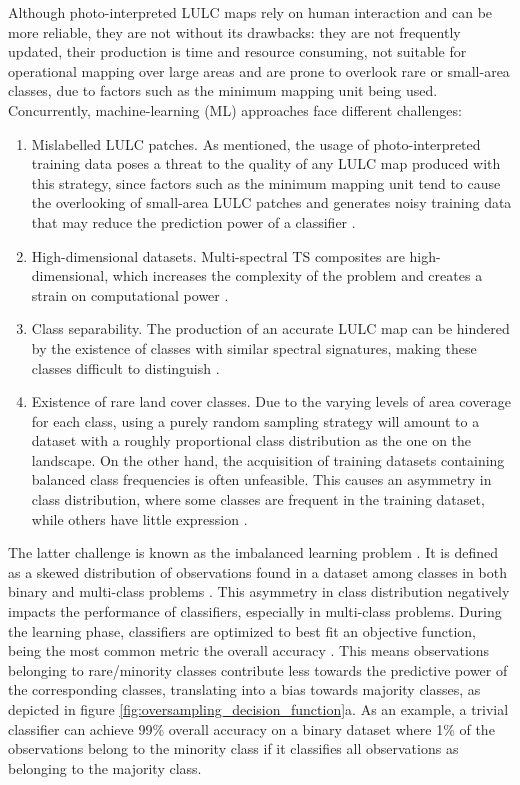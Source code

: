 \documentclass[parskip=full]{scrartcl}
\begin{document}
Although photo-interpreted LULC maps rely on human interaction and can be more
reliable, they are not without its drawbacks: they are not frequently updated,
their production is time and resource consuming, not suitable for operational
mapping over large areas and are prone to overlook rare or small-area classes,
due to factors such as the minimum mapping unit being used. Concurrently,
machine-learning (ML) approaches face different challenges:
\begin{enumerate}
	\item Mislabelled LULC patches. As mentioned, the usage of photo-interpreted training
	      data poses a threat to the quality of any LULC map produced with this strategy,
	      since factors such as the minimum mapping unit tend to cause the overlooking of
	      small-area LULC patches and generates noisy training data that may reduce the
	      prediction power of a classifier \cite{Pelletier2017}.
	\item High-dimensional datasets. Multi-spectral TS composites are high-dimensional,
	      which increases the complexity of the problem and creates a strain on
	      computational power \cite{Stromann2020}.
	\item Class separability. The production of an accurate LULC map can be hindered by
	      the existence of classes with similar spectral signatures, making these classes
	      difficult to distinguish \cite{Alonso-Sarria2019}.
	\item Existence of rare land cover classes. Due to the varying levels of area
	      coverage for each class, using a purely random sampling strategy will amount to
	      a dataset with a roughly proportional class distribution as the one on the
	      landscape. On the other hand, the acquisition of training datasets containing
	      balanced class frequencies is often unfeasible. This causes an asymmetry in
	      class distribution, where some classes are frequent in the training dataset,
	      while others have little expression \cite{Wang2019, Feng2019}.
\end{enumerate}


The latter challenge is known as the imbalanced learning problem
\cite{Chawla2004}. It is defined as a skewed distribution of observations
found in a dataset among classes in both binary and multi-class problems
\cite{Abdi2016}. This asymmetry in class distribution negatively impacts
the performance of classifiers, especially in multi-class problems. During the
learning phase, classifiers are optimized to best fit an objective function,
being the most common  metric the overall accuracy \cite{Maxwell2018}. This
means observations belonging to rare/minority classes contribute less towards
the predictive power of the corresponding classes, translating into a bias
towards majority classes, as depicted in figure \ref{fig:oversampling_decision_function}a. As an
example, a trivial classifier can achieve 99\% overall accuracy on a binary
dataset where 1\% of the observations belong to the minority class if it
classifies all observations as belonging to the majority class.
\end{document}
